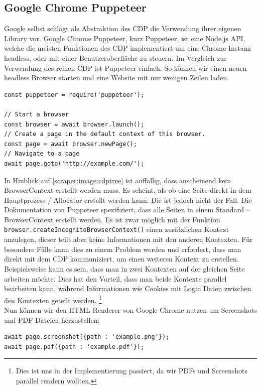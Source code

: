 \subsection*{Google Chrome Puppeteer} \label{scraper:subsec:puppeteer}
Google selbst schlägt als Abstraktion des \ac{CDP} die Verwendung ihrer eigenen Library vor. Google Chrome Puppeteer, kurz Puppeteer, ist eine Node.js API, welche die meisten Funktionen des \ac{CDP} implementiert um eine Chrome Instanz headless, oder mit einer Benutzeroberfläche zu steuern. \cite{puppeteer} Im Vergleich zur Verwendung des reinen \ac{CDP} ist Puppeteer einfach. So können wir einen neuen headless Browser starten und eine Website mit nur wenigen Zeilen laden.
\begin{verbatim}
const puppeteer = require('puppeteer');

// Start a browser
const browser = await browser.launch(); 
// Create a page in the default context of this browser.
const page = await browser.newPage();  
// Navigate to a page
await page.goto('http://example.com/'); 
\end{verbatim}
In Hinblick auf \autoref{scraper:image:cdptree} ist auffällig, dass anscheinend kein BrowserContext erstellt werden muss. Es scheint, als ob eine Seite direkt in dem Hauptprozess / Allocator erstellt werden kann. Die ist jedoch nicht der Fall. Die Dokumentation von Puppeteer spezifiziert, dass alle Seiten in einem Standard – BrowserContext erstellt werden. Es ist zwar möglich mit der Funktion \texttt{browser.createIncognitoBrowserContext()} einen zusätzlichen Kontext anzulegen, dieser teilt aber keine Informationen mit den anderen Kontexten. Für besondere Fälle kann dies zu einem Problem werden und erfordert, dass man direkt mit dem CDP kommuniziert, um einen weiteren Kontext zu erstellen. Beispielsweise kann es sein, dass man in zwei Kontexten auf der gleichen Seite arbeiten möchte. Dies hat den Vorteil, dass man beide Kontexte parallel bearbeiten kann, während Informationen wie Cookies mit Login Daten zwischen den Kontexten geteilt werden. \footnote{Dies ist uns in der Implementierung passiert, da wir PDFs und Screenshots parallel rendern wollten.} \\
Nun können wir den HTML Renderer von Google Chrome nutzen um Screenshots und PDF Dateien herzustellen:  
\begin{verbatim}
await page.screenshot({path : 'example.png'});
await page.pdf({path : 'example.pdf'});
\end{verbatim}